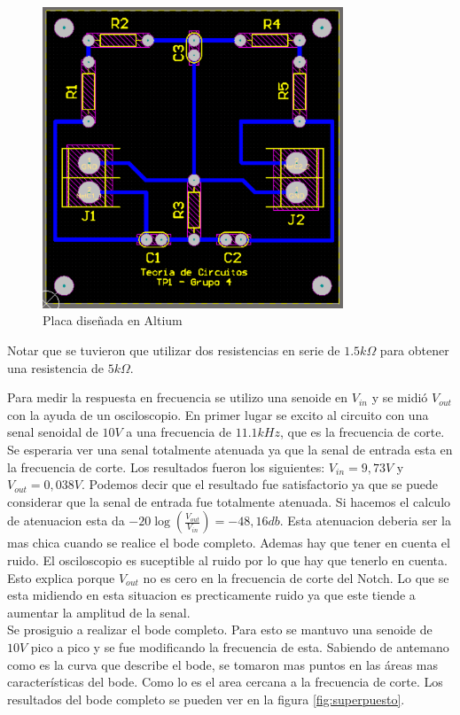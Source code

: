 \documentclass[12pt,a4paper]{article}
\begin{document}
\begin{figure}[ht]                                                       
    \centering\includegraphics[width=0.8\textwidth]{placa_altium.png}
    \caption{Placa diseñada en Altium}
    \label{fig:placa_altium}
    \end{figure}

Notar que se tuvieron que utilizar dos resistencias en serie de $1.5k\Omega$ para obtener una
resistencia de $5k\Omega$. 

Para medir la respuesta en frecuencia se utilizo una senoide en $V_{in}$ y se midió $V_{out}$
con la ayuda de un osciloscopio. En primer lugar se excito al circuito con una senal 
senoidal de $10V$ a una frecuencia de $11.1kHz$, que es la frecuencia de corte. Se esperaria ver 
una senal totalmente atenuada ya que la senal de entrada esta en la frecuencia de corte. 
Los resultados fueron los siguientes: $V_{in}=9,73V$ y $V_{out}= 0,038V$. Podemos decir 
que el resultado fue satisfactorio ya que se puede considerar que la senal de entrada fue totalmente atenuada.
Si hacemos el calculo de atenuacion esta da $-20\log(\frac{V_{out}}{V_{in}}) = -48,16db$. Esta atenuacion deberia ser
la mas chica cuando se realice el bode completo. Ademas hay que tener en cuenta el ruido. El 
osciloscopio es suceptible al ruido por lo que hay que tenerlo en cuenta. Esto explica porque $V_{out}$
no es cero en la frecuencia de corte del Notch. Lo que se esta midiendo en esta situacion es precticamente ruido ya que 
este tiende a aumentar la amplitud de la senal. \\
Se prosiguio a realizar el bode completo. Para esto se mantuvo una senoide de $10V$ pico a pico
y se fue modificando la frecuencia de esta. Sabiendo de antemano como es la curva que 
describe el bode, se tomaron mas puntos en las áreas mas características del bode. Como lo es el area
cercana a la frecuencia de corte. Los resultados del bode completo se pueden ver en la figura \ref{fig:superpuesto}.
\end{document}
